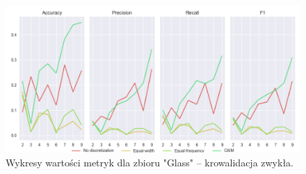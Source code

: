 \begin{figure}[H]
    \includegraphics[width=\textwidth]{img/cv_scores_kfold/scoring_kfold_glass.png}
    \caption{Wykresy wartości metryk dla zbioru "Glass" -- krowalidacja zwykła.}
\end{figure}

